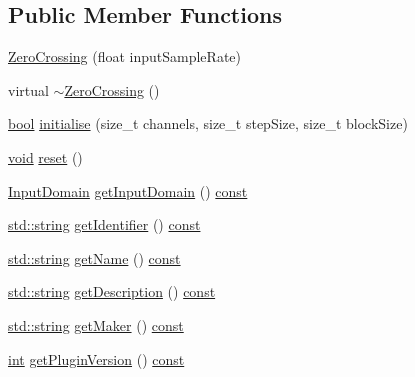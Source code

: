 \subsection*{Public Member Functions}
\begin{DoxyCompactItemize}
\item 
\hyperlink{class_zero_crossing_a9855153a54bdc9ba75cc1a705a149473}{Zero\+Crossing} (float input\+Sample\+Rate)
\item 
virtual \hyperlink{class_zero_crossing_af1de0da862e6e2443581e4e16044675b}{$\sim$\+Zero\+Crossing} ()
\item 
\hyperlink{mac_2config_2i386_2lib-src_2libsoxr_2soxr-config_8h_abb452686968e48b67397da5f97445f5b}{bool} \hyperlink{class_zero_crossing_af21bbcc87a6eb7875dfab7d86222dccc}{initialise} (size\+\_\+t channels, size\+\_\+t step\+Size, size\+\_\+t block\+Size)
\item 
\hyperlink{sound_8c_ae35f5844602719cf66324f4de2a658b3}{void} \hyperlink{class_zero_crossing_a9ae6c4a31ea027dceb1e97ead807e228}{reset} ()
\item 
\hyperlink{class_vamp_1_1_plugin_a39cb7649d6dcc20e4cb1640cd55907bc}{Input\+Domain} \hyperlink{class_zero_crossing_aafe2ce6ebd353a14c40db7e8e60f4051}{get\+Input\+Domain} () \hyperlink{getopt1_8c_a2c212835823e3c54a8ab6d95c652660e}{const} 
\item 
\hyperlink{test__lib_f_l_a_c_2format_8c_ab02026ad0de9fb6c1b4233deb0a00c75}{std\+::string} \hyperlink{class_zero_crossing_af2baf9e19fcdd11cfe97ace56d4f5c1a}{get\+Identifier} () \hyperlink{getopt1_8c_a2c212835823e3c54a8ab6d95c652660e}{const} 
\item 
\hyperlink{test__lib_f_l_a_c_2format_8c_ab02026ad0de9fb6c1b4233deb0a00c75}{std\+::string} \hyperlink{class_zero_crossing_afa96f7ce6e7d9f03768f48c6a9d88498}{get\+Name} () \hyperlink{getopt1_8c_a2c212835823e3c54a8ab6d95c652660e}{const} 
\item 
\hyperlink{test__lib_f_l_a_c_2format_8c_ab02026ad0de9fb6c1b4233deb0a00c75}{std\+::string} \hyperlink{class_zero_crossing_a710bb0b013157adaeef2a9e6867b4478}{get\+Description} () \hyperlink{getopt1_8c_a2c212835823e3c54a8ab6d95c652660e}{const} 
\item 
\hyperlink{test__lib_f_l_a_c_2format_8c_ab02026ad0de9fb6c1b4233deb0a00c75}{std\+::string} \hyperlink{class_zero_crossing_ac68561634a3c329a029c2fd3deaeae2a}{get\+Maker} () \hyperlink{getopt1_8c_a2c212835823e3c54a8ab6d95c652660e}{const} 
\item 
\hyperlink{xmltok_8h_a5a0d4a5641ce434f1d23533f2b2e6653}{int} \hyperlink{class_zero_crossing_ad685f6c2f443f07a1634550c335571eb}{get\+Plugin\+Version} () \hyperlink{getopt1_8c_a2c212835823e3c54a8ab6d95c652660e}{const} 

\end{DoxyCompactItemize}
